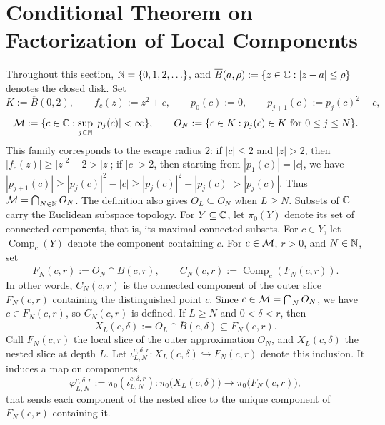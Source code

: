 \section{Conditional Theorem on Factorization of Local Components}
\label{sec:remaining-factorization}

Throughout this section, \(\mathbb N=\{0,1,2,\ldots\}\), and
\(\overline B(a,\rho):=\{z\in\mathbb C:|z-a|\le\rho\}\) denotes the closed
disk. Set
\[
 K:=\overline B(0,2),\qquad f_c(z):=z^2+c,\qquad
 p_0(c):=0,\qquad p_{j+1}(c):=p_j(c)^2+c,
\]
\[
 \mathcal M:=\{c\in\mathbb C:\sup_{j\in\mathbb N}|p_j(c)|<\infty\},\qquad
 O_N:=\{c\in K:p_j(c)\in K\text{ for }0\le j\le N\}.
\]
This family corresponds to the escape radius \(2\): if \(|c|\le2\)
and \(|z|>2\), then \(|f_c(z)|\ge|z|^2-2>|z|\); if \(|c|>2\), then
starting from \(|p_1(c)|=|c|\), we have
\(|p_{j+1}(c)|\ge|p_j(c)|^2-|c|\ge|p_j(c)|^2-|p_j(c)|>|p_j(c)|\).
Thus \(\mathcal M=\bigcap_{N\in\mathbb N}O_N\). The definition also gives
\(O_L\subseteq O_N\) when \(L\ge N\). Subsets of \(\mathbb C\) carry the
Euclidean subspace topology. For \(Y\subseteq\mathbb C\), let \(\pi_0(Y)\)
denote its set of connected components, that is, its maximal connected
subsets. For \(c\in Y\), let \(\operatorname{Comp}_c(Y)\) denote the
component containing \(c\). For \(c\in\mathcal M\), \(r>0\), and \(N\in\mathbb N\),
set
\[
 F_N(c,r):=O_N\cap\overline B(c,r),\qquad
 C_N(c,r):=\operatorname{Comp}_c(F_N(c,r)).
\]
In other words, \(C_N(c,r)\) is the connected component of the outer
slice \(F_N(c,r)\) containing the distinguished point \(c\). Since
\(c\in\mathcal M=\bigcap_NO_N\), we have \(c\in F_N(c,r)\), so \(C_N(c,r)\) is
defined. If \(L\ge N\) and \(0<\delta<r\), then
\[
 X_L(c,\delta):=O_L\cap\overline B(c,\delta)
 \subseteq F_N(c,r).
\]
\noindent
Call \(F_N(c,r)\) the local slice of the outer approximation \(O_N\),
and \(X_L(c,\delta)\) the nested slice at depth \(L\). Let
\(\iota_{L,N}^{c;\delta,r}:X_L(c,\delta)\hookrightarrow F_N(c,r)\)
denote this inclusion. It induces a map on components
\[
 \varphi_{L,N}^{c;\delta,r}:=
 \pi_0\!\left(\iota_{L,N}^{c;\delta,r}\right):
 \pi_0\bigl(X_L(c,\delta)\bigr)\longrightarrow
 \pi_0\bigl(F_N(c,r)\bigr),
\]
that sends each component of the nested slice to the unique component
of \(F_N(c,r)\) containing it.

